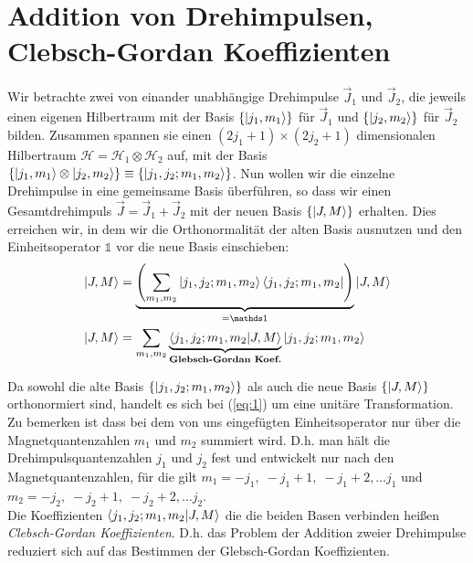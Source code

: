 







\section*{Addition von Drehimpulsen, Clebsch-Gordan Koeffizienten}
\label{sec:addit-von-dreh}

Wir betrachte zwei von einander unabhängige Drehimpulse \(\vec J_1\) und \(\vec
J_2\), die jeweils einen eigenen Hilbertraum mit der Basis \(\{\left| j_1,m_1 \right\rangle\}\)
für \(\vec J_1\) und \(\{\left| j_2,m_2 \right\rangle\}\) für \(\vec J_2\) bilden. Zusammen
spannen sie einen \((2j_1+1) \times (2j_2+1)\) dimensionalen Hilbertraum
\(\mathcal H = \mathcal H_1 \otimes \mathcal H_2\) auf, mit der Basis
\(\{\left| j_1,m_1 \right\rangle \otimes \left| j_2,m_2 \right\rangle\} \equiv \{\left| j_1,j_2;m_1,m_2 \right\rangle\}\).
Nun wollen wir die einzelne Drehimpulse in eine gemeinsame Basis überführen, so
dass wir einen Gesamtdrehimpuls \(\vec J=\vec J_1+\vec J_2\) mit der neuen Basis
\(\{\left| J,M \right\rangle\}\) erhalten. Dies erreichen wir, in dem wir die Orthonormalität
der alten Basis ausnutzen und den Einheitsoperator \(\mathds 1\) vor die neue
Basis einschieben:
\begin{align}
  \label{eq:1}
  \ket{J,M}&=\underbrace{\left(
      \sum_{m_1,m_2}\ket{j_1,j_2;m_1,m_2}\bra{j_1,j_2;m_1,m_2}
    \right)}_{= \mathds 1}
  \ket{J,M}\notag\\
   \ket{J,M}&= \sum_{m_1,m_2} 
   \underbrace{\braket{j_1,j_2;m_1,m_2}{J,M}}_
   {\text{\textbf{Glebsch-Gordan Koef.}}}
   \ket{j_1,j_2;m_1,m_2}
\end{align}

Da sowohl die alte Basis \( \{\left| j_1,j_2;m_1,m_2 \right\rangle\}\) als auch die neue Basis
\(\{\left| J,M \right\rangle\}\) orthonormiert sind, handelt es sich bei (\ref{eq:1}) um eine
unitäre Transformation. Zu bemerken ist dass bei dem von uns eingefügten
Einheitsoperator nur über die Magnetquantenzahlen \(m_1\) und \(m_2\) summiert
wird. D.h. man hält die Drehimpulsquantenzahlen \(j_1\) und \(j_2\) fest und
entwickelt nur nach den Magnetquantenzahlen, für die gilt \(m_1 = -j_1,\; -j_1+1,
\;-j_1+2, \dots j_1\) und \(m_2 = -j_2, \;-j_2+1,\;-j_2+2, \dots j_2\).\\
Die Koeffizienten \( \braket{j_1,j_2;m_1,m_2}{J,M} \) die die beiden Basen verbinden
heißen \emph{Clebsch-Gordan Koeffizienten}. D.h. das Problem der Addition zweier
Drehimpulse reduziert sich auf das Bestimmen der Glebsch-Gordan Koeffizienten.

